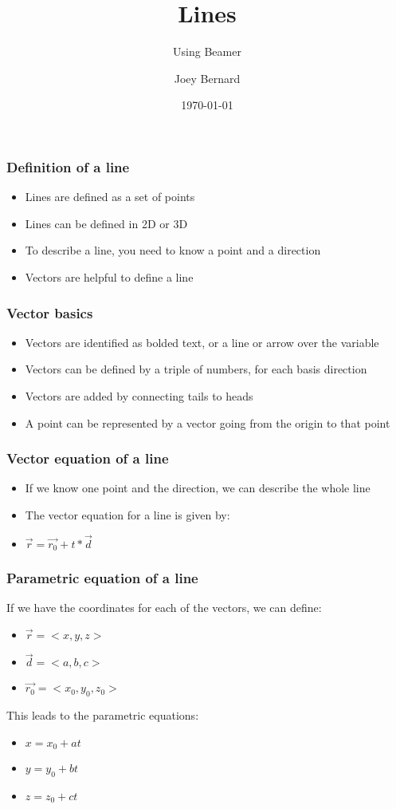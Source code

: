\documentclass{beamer}
\title{Lines}
\subtitle{Using Beamer}
\author{Joey Bernard}
\institute{University of New Brunswick}
\date{\today}
\begin{document}
\begin{frame}
  \titlepage
\end{frame}

\begin{frame}
  \frametitle{Definition of a line}
  \begin{itemize}
  \item Lines are defined as a set of points
  \item Lines can be defined in 2D or 3D
  \item To describe a line, you need to know a point and a direction
  \item Vectors are helpful to define a line
  \end{itemize}
\end{frame}

\begin{frame}
  \frametitle{Vector basics}
  \begin{itemize}
  \item Vectors are identified as bolded text, or a line or arrow over the variable
  \item Vectors can be defined by a triple of numbers, for each basis direction
  \item Vectors are added by connecting tails to heads
  \item A point can be represented by a vector going from the origin to that point
  \end{itemize}
\end{frame}

\begin{frame}
  \frametitle{Vector equation of a line}
  \begin{itemize}
  \item If we know one point and the direction, we can describe the whole line
  \item The vector equation for a line is given by:
  \item $\vec{r} = \vec{r_0} + t * \vec{d}$
  \end{itemize}
\end{frame}

\begin{frame}
  \frametitle{Parametric equation of a line}
  If we have the coordinates for each of the vectors, we can define:
  \begin{itemize}
  \item $\vec{r} = <x, y, z>$
  \item $\vec{d} = <a, b, c>$
  \item $\vec{r_0} = <x_0, y_0, z_0>$
  \end{itemize}
  This leads to the parametric equations:
  \begin{itemize}
  \item $x = x_0 + at$
  \item $y = y_0 + bt$
  \item $z = z_0 + ct$
  \end{itemize}
\end{frame}
\end{document}
